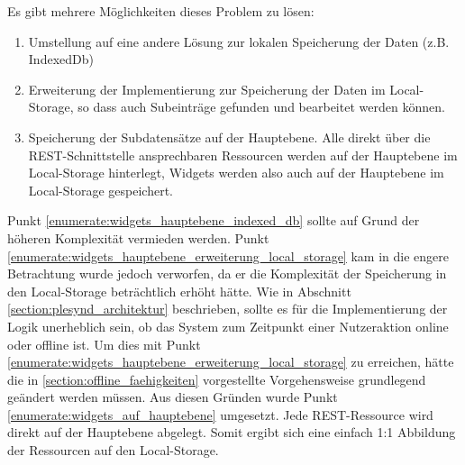 Es gibt mehrere Möglichkeiten dieses Problem zu lösen:
\begin{enumerate}
 \item\label{enumerate:widgets_hauptebene_indexed_db} Umstellung auf eine andere Lösung zur lokalen Speicherung der Daten (z.B. IndexedDb)
 \item\label{enumerate:widgets_hauptebene_erweiterung_local_storage} Erweiterung der Implementierung zur Speicherung der Daten im Local-Storage, so dass auch Subeinträge gefunden und bearbeitet werden können.
 \item\label{enumerate:widgets_auf_hauptebene} Speicherung der Subdatensätze auf der Hauptebene. Alle direkt über die REST-Schnittstelle ansprechbaren Ressourcen werden auf der Hauptebene im Local-Storage hinterlegt, Widgets werden also auch auf der Hauptebene im Local-Storage gespeichert.
\end{enumerate}
Punkt \ref{enumerate:widgets_hauptebene_indexed_db} sollte auf Grund der höheren Komplexität vermieden werden. Punkt \ref{enumerate:widgets_hauptebene_erweiterung_local_storage} kam in die engere Betrachtung wurde jedoch verworfen, da er die Komplexität der Speicherung in den Local-Storage beträchtlich erhöht hätte. Wie in Abschnitt \ref{section:plesynd_architektur} beschrieben, sollte es für die Implementierung der Logik unerheblich sein, ob das System zum Zeitpunkt einer Nutzeraktion online oder offline ist. Um dies mit Punkt \ref{enumerate:widgets_hauptebene_erweiterung_local_storage} zu erreichen, hätte die in \ref{section:offline_faehigkeiten} vorgestellte Vorgehensweise grundlegend geändert werden müssen. Aus diesen Gründen wurde Punkt \ref{enumerate:widgets_auf_hauptebene} umgesetzt. Jede REST-Ressource wird direkt auf der Hauptebene abgelegt. Somit ergibt sich eine einfach 1:1 Abbildung der Ressourcen auf den Local-Storage. 

